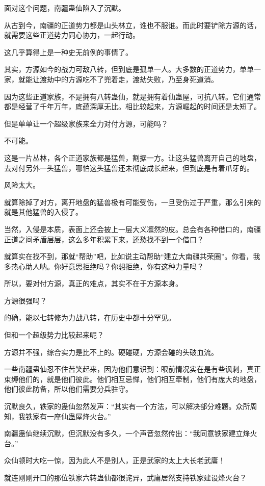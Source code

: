 \begin{this_body}
面对这个问题，南疆蛊仙陷入了沉默。

从古到今，南疆的正道势力都是山头林立，谁也不服谁。而此时要铲除方源的话，就需要这些正道势力同心协力，一起行动。

这几乎算得上是一种史无前例的事情了。

其实，方源如今的战力可敌八转，但到底是孤单一人。大多数的正道势力，单单一家，就能让渡劫中的方源吃不了兜着走，渡劫失败，乃至身死道消。

因为这些正道家族，不是拥有八转蛊仙，就是拥有着仙蛊屋，可抗八转。它们通常都是经营了千年万年，底蕴深厚无比。相比较起来，方源崛起的时间还是太短了。

但是单单让一个超级家族来全力对付方源，可能吗？

不可能。

这是一片丛林，各个正道家族都是猛兽，割据一方。让这头猛兽离开自己的地盘，去对付另外一头猛兽，哪怕这头猛兽还未彻底成长起来，但到底是有着爪牙的。

风险太大。

就算除掉了对方，离开地盘的猛兽极有可能受伤，一旦受伤过于严重，那么引来的就是其他猛兽的入侵了。

当然，入侵是本质，表面上还会披上一层大义凛然的皮。总会有各种借口的，南疆正道之间矛盾层层，这么多年积累下来，还愁找不到一个借口？

就算实在找不到，那就“帮助”吧，比如说主动帮助“建立大南疆共荣圈”。你看，我多热心助人呐。你好意思拒绝吗？你想拒绝，你有这种力量吗？

所以，要对付方源，真正的难点，其实不在于方源本身。

方源很强吗？

的确，能以七转修为力战八转，在历史中都十分罕见。

但和一个超级势力比较起来呢？

方源并不强，综合实力是比不上的。硬碰硬，方源会碰的头破血流。

一些南疆蛊仙忍不住苦笑起来，因为他们意识到：眼前情况实在是有些讽刺，真正束缚他们的，就是他们彼此。他们相互忌惮，他们相互牵制，他们有庞大的地盘，他们彼此防备，所以他们需要分兵驻守。

沉默良久，铁家的蛊仙忽然发声：“其实有一个方法，可以解决部分难题。众所周知，我铁家有一座仙蛊屋烽火台。”

南疆蛊仙继续沉默，但沉默没有多久，一个声音忽然传出：“我同意铁家建立烽火台。”

众仙顿时大吃一惊，因为此人不是别人，正是武家的太上大长老武庸！

就连刚刚开口的那位铁家六转蛊仙都很诧异，武庸居然支持铁家建设烽火台？


\end{this_body}
